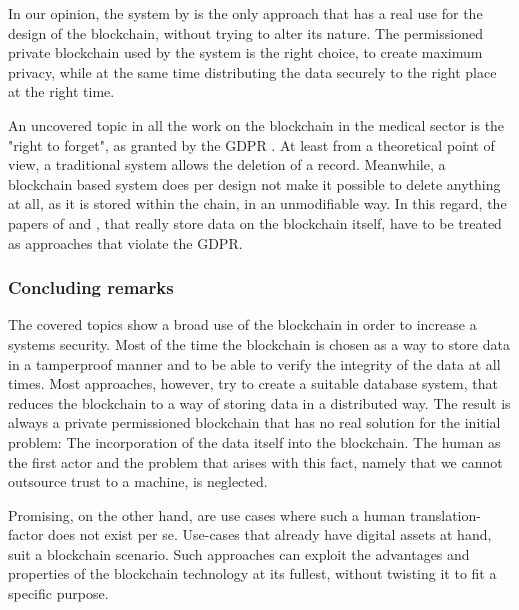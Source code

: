 In our opinion, the system by \citeauthor{Baccarini2018} is the only approach that has a real use for the design of the blockchain, without trying to alter its nature. The permissioned private blockchain used by the system is the right choice, to create maximum privacy, while at the same time distributing the data securely to the right place at the right time. \cite{Wust2017}

An uncovered topic in all the work on the blockchain in the medical sector is the "right to forget", as granted by the GDPR \cite{EuropeanCommission2017}. At least from a theoretical point of view, a traditional system allows the deletion of a record. Meanwhile, a blockchain based system does per design not make it possible to delete anything at all, as it is stored within the chain, in an unmodifiable way. In this regard, the papers of \cite{Cao2019} and \cite{Azaria2016}, that really store data on the blockchain itself, have to be treated as approaches that violate the GDPR.

\subsubsection{Concluding remarks}
The covered topics show a broad use of the blockchain in order to increase a systems security. Most of the time the blockchain is chosen as a way to store data in a tamperproof manner and to be able to verify the integrity of the data at all times.
Most approaches, however, try to create a suitable database system, that reduces the blockchain to a way of storing data in a distributed way. The result is always a private permissioned blockchain that has no real solution for the initial problem: The incorporation of the data itself into the blockchain. The human as the first actor and the problem that arises with this fact, namely that we cannot outsource trust to a machine, is neglected.

Promising, on the other hand, are use cases where such a human translation-factor does not exist per se. Use-cases that already have digital assets at hand, suit a blockchain scenario. Such approaches can exploit the advantages and properties of the blockchain technology at its fullest, without twisting it to fit a specific purpose.

